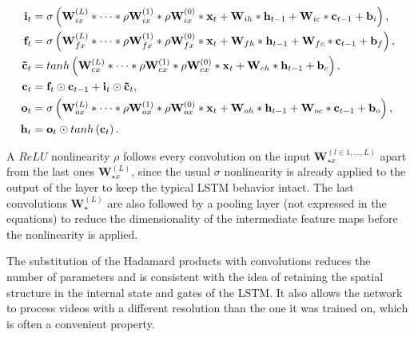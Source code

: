 \begin{equation}\label{eq:deconvLSTM_enc}
\begin{split}
    \mathbf{i}_t &= \sigma\left(
        \mathbf{W}_{ix}^{(L)} * \dots * \rho \mathbf{W}_{ix}^{(1)} *
            \rho \mathbf{W}_{ix}^{(0)} * \mathbf{x}_t +
        \mathbf{W}_{ih} * \mathbf{h}_{t-1} +
        \mathbf{W}_{ic} * \mathbf{c}_{t-1} +
        \mathbf{b}_i \right),\\
    \mathbf{f}_t &= \sigma\left(
        \mathbf{W}_{fx}^{(L)} * \dots * \rho \mathbf{W}_{fx}^{(1)} *
            \rho \mathbf{W}_{fx}^{(0)} * \mathbf{x}_t +
        \mathbf{W}_{fh} * \mathbf{h}_{t-1} +
        \mathbf{W}_{fc} * \mathbf{c}_{t-1} +
        \mathbf{b}_f \right),\\
    \mathbf{\tilde c}_t &= tanh \left(\mathbf{W}_{cx}^{(L)} * \dots *
            \rho \mathbf{W}_{cx}^{(1)} * \rho \mathbf{W}_{cx}^{(0)} *
            \mathbf{x}_t +
        \mathbf{W}_{ch} * \mathbf{h}_{t-1} + \mathbf{b}_c \right),\\
    \mathbf{c}_t &= \mathbf{f}_t \odot \mathbf{c}_{t-1} + \mathbf{i}_t
        \odot \mathbf{\tilde c}_t,\\
    \mathbf{o}_t &= \sigma\left(
        \mathbf{W}_{ox}^{(L)} * \dots * \rho \mathbf{W}_{ox}^{(1)} *
            \rho \mathbf{W}_{ox}^{(0)} * \mathbf{x}_t +
        \mathbf{W}_{oh} * \mathbf{h}_{t-1} +
        \mathbf{W}_{oc} * \mathbf{c}_{t-1} +
        \mathbf{b}_o \right),\\
    \mathbf{h}_t &= \mathbf{o}_t \odot tanh \left(\mathbf{c}_t\right).
\end{split}
\end{equation}

\noindent A $ReLU$ nonlinearity $\rho$ follows every convolution on the input
$\mathbf{W}_{\star x}^{(l \in {1,\dots,L})}$ apart from the last ones
$\mathbf{W}_{\star x}^{(L)}$, since the usual $\sigma$ nonlinearity is already
applied to the output of the layer to keep the typical LSTM behavior intact.
The last convolutions $\mathbf{W}_\star^{(L)}$ are also followed by a pooling
layer (not expressed in the equations) to reduce the dimensionality of the
intermediate feature maps before the nonlinearity is applied.

The substitution of the Hadamard products with convolutions reduces the number
of parameters and is consistent with the idea of retaining the spatial
structure in the internal state and gates of the LSTM. It also allows the
network to process videos with a different resolution than the one it was
trained on, which is often a convenient property.


